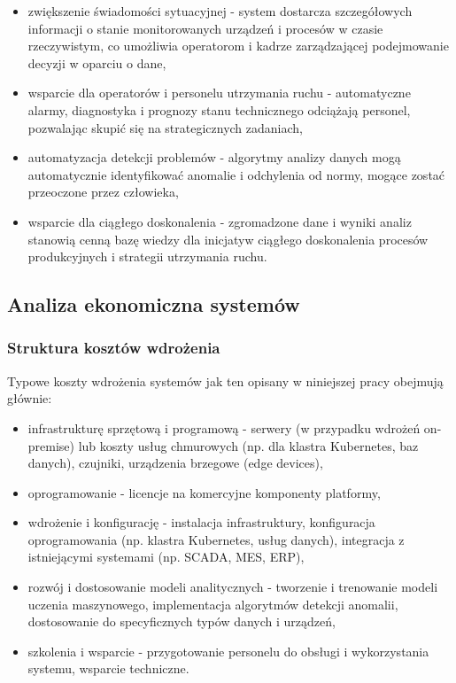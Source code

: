 \begin{itemize}
    \item zwiększenie świadomości sytuacyjnej - system dostarcza szczegółowych informacji o stanie monitorowanych urządzeń i procesów w czasie rzeczywistym, co umożliwia operatorom i kadrze zarządzającej podejmowanie decyzji w oparciu o dane,
    \item wsparcie dla operatorów i personelu utrzymania ruchu - automatyczne alarmy, diagnostyka i prognozy stanu technicznego odciążają personel, pozwalając skupić się na strategicznych zadaniach,
    \item automatyzacja detekcji problemów - algorytmy analizy danych mogą automatycznie identyfikować anomalie i odchylenia od normy, mogące zostać przeoczone przez człowieka,
    \item wsparcie dla ciągłego doskonalenia - zgromadzone dane i wyniki analiz stanowią cenną bazę wiedzy dla inicjatyw ciągłego doskonalenia procesów produkcyjnych i strategii utrzymania ruchu.
\end{itemize}

\subsection{Analiza ekonomiczna systemów}
\label{subsec:analiza_ekonomiczna}

\subsubsection{Struktura kosztów wdrożenia}
\label{subsubsec:struktura_kosztow}

Typowe koszty wdrożenia systemów jak ten opisany w niniejszej pracy obejmują głównie:

\vspace{0.3em}

\begin{itemize}
    \item infrastrukturę sprzętową i programową - serwery (w przypadku wdrożeń on-premise) lub koszty usług chmurowych (np. dla klastra Kubernetes, baz danych), czujniki, urządzenia brzegowe (edge devices),
    \item oprogramowanie - licencje na komercyjne komponenty platformy,
    \item wdrożenie i konfigurację - instalacja infrastruktury, konfiguracja oprogramowania (np. klastra Kubernetes, usług danych), integracja z istniejącymi systemami (np. SCADA, MES, ERP),
    \item rozwój i dostosowanie modeli analitycznych - tworzenie i trenowanie modeli uczenia maszynowego, implementacja algorytmów detekcji anomalii, dostosowanie do specyficznych typów danych i urządzeń,
    \item szkolenia i wsparcie - przygotowanie personelu do obsługi i wykorzystania systemu, wsparcie techniczne.
\end{itemize}

